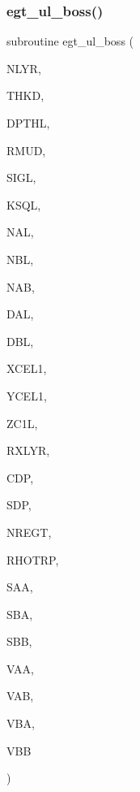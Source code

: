 \subsubsection{\texorpdfstring{egt\+\_\+ul\+\_\+boss()}{egt\_ul\_boss()}}
{\footnotesize\ttfamily subroutine egt\+\_\+ul\+\_\+boss (\begin{DoxyParamCaption}\item[{integer}]{N\+L\+YR,  }\item[{real (kind=ql), dimension(nlyr)}]{T\+H\+KD,  }\item[{real (kind=ql), dimension(nlyr)}]{D\+P\+T\+HL,  }\item[{real (kind=ql), dimension(0\+:nlyr)}]{R\+M\+UD,  }\item[{complex(kind=ql), dimension(nlyr)}]{S\+I\+GL,  }\item[{complex(kind=ql), dimension(nlyr)}]{K\+S\+QL,  }\item[{integer}]{N\+AL,  }\item[{integer}]{N\+BL,  }\item[{integer}]{N\+AB,  }\item[{real}]{D\+AL,  }\item[{real}]{D\+BL,  }\item[{real, dimension(nab)}]{X\+C\+E\+L1,  }\item[{real, dimension(nab)}]{Y\+C\+E\+L1,  }\item[{real, dimension(nbl)}]{Z\+C1L,  }\item[{integer}]{R\+X\+L\+YR,  }\item[{real}]{C\+DP,  }\item[{real}]{S\+DP,  }\item[{integer}]{N\+R\+E\+GT,  }\item[{real, dimension(nregt)}]{R\+H\+O\+T\+RP,  }\item[{complex, dimension(nbl,nbl,nal,nal)}]{S\+AA,  }\item[{complex, dimension(nbl,nbl,nal,nal)}]{S\+BA,  }\item[{complex, dimension(nbl,nbl,nal,nal)}]{S\+BB,  }\item[{complex, dimension(nbl,nbl,nal,nal)}]{V\+AA,  }\item[{complex, dimension(nbl,nbl,nal,nal)}]{V\+AB,  }\item[{complex, dimension(nbl,nbl,nal,nal)}]{V\+BA,  }\item[{complex, dimension(nbl,nbl,nal,nal)}]{V\+BB }\end{DoxyParamCaption})}

